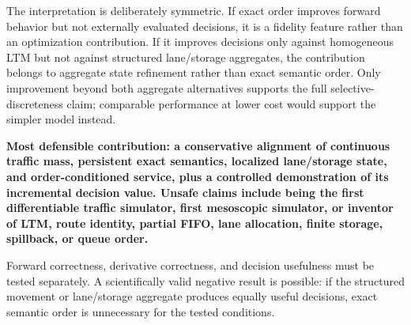 \documentclass[10pt,a4paper]{article}
\newcommand{\conclusion}[1]{\begin{center}\colorbox{bluegray}{\parbox{0.94\linewidth}{\textbf{#1}}}\end{center}}
\begin{document}
The interpretation is deliberately symmetric. If exact order improves forward behavior but not externally evaluated decisions, it is a fidelity feature rather than an optimization contribution. If it improves decisions only against homogeneous LTM but not against structured lane/storage aggregates, the contribution belongs to aggregate state refinement rather than exact semantic order. Only improvement beyond both aggregate alternatives supports the full selective-discreteness claim; comparable performance at lower cost would support the simpler model instead.

\conclusion{Most defensible contribution: a conservative alignment of continuous traffic mass, persistent exact semantics, localized lane/storage state, and order-conditioned service, plus a controlled demonstration of its incremental decision value. Unsafe claims include being the first differentiable traffic simulator, first mesoscopic simulator, or inventor of LTM, route identity, partial FIFO, lane allocation, finite storage, spillback, or queue order.}

Forward correctness, derivative correctness, and decision usefulness must be tested separately. A scientifically valid negative result is possible: if the structured movement or lane/storage aggregate produces equally useful decisions, exact semantic order is unnecessary for the tested conditions.
\end{document}
